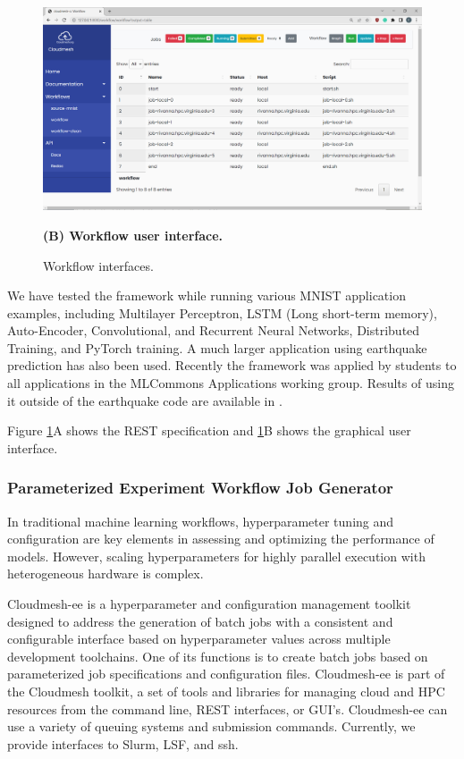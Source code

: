 \documentclass[utf8]{FrontiersinVancouver} %
\begin{document}
\begin{figure}[htb]
{    \centering\includegraphics[width=0.8\columnwidth]{images/cc-1.jpg}

    {\bf (B) Workflow user interface.}

}
  

    \caption{Workflow interfaces.}
    \label{fig:cc-3}
\end{figure}


We have tested the framework while running various MNIST application examples, including Multilayer Perceptron, LSTM (Long short-term memory), Auto-Encoder, Convolutional, and Recurrent Neural Networks, Distributed Training, and PyTorch training.  A much larger application using earthquake prediction has also been used.
Recently the framework was applied by students to all applications in the MLCommons Applications working group. Results of using it outside of the earthquake code are available in \cite{las-2023-escience}.

Figure \ref{fig:cc-3}A shows the REST specification and \ref{fig:cc-3}B shows the graphical user interface.

\subsubsection{Parameterized Experiment Workflow Job Generator}
\label{sec:workflow-ee}

In traditional machine learning workflows, hyperparameter tuning and configuration are key elements in assessing and optimizing the performance of models. However, scaling hyperparameters for highly parallel execution with heterogeneous hardware is complex.

Cloudmesh-ee \cite{cloudmesh-ee,las-2023-escience} is a hyperparameter and configuration management toolkit designed to address the generation of batch jobs with a consistent and configurable interface based on hyperparameter values across multiple development toolchains. One of its functions is to create batch jobs based on parameterized job specifications and configuration files.  Cloudmesh-ee is part of the Cloudmesh toolkit, a set of tools and libraries for managing cloud and HPC resources from the command line, REST interfaces, or GUI's.  Cloudmesh-ee can use a variety of queuing systems and submission commands. Currently, we provide interfaces to Slurm, LSF, and ssh. 
\end{document}

